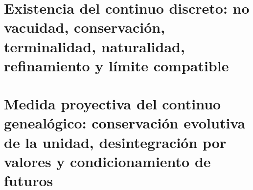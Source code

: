 

\chapter{Existencia del continuo discreto: no vacuidad, conservación, terminalidad, naturalidad, refinamiento y límite compatible}
\label{chap:sucesor-102-06}
\label{owner:sucesor-102-04b3-unico}
















\chapter{Medida proyectiva del continuo genealógico: conservación evolutiva de la unidad, desintegración por valores y condicionamiento de futuros}
\label{chap:sucesor-102-07}




